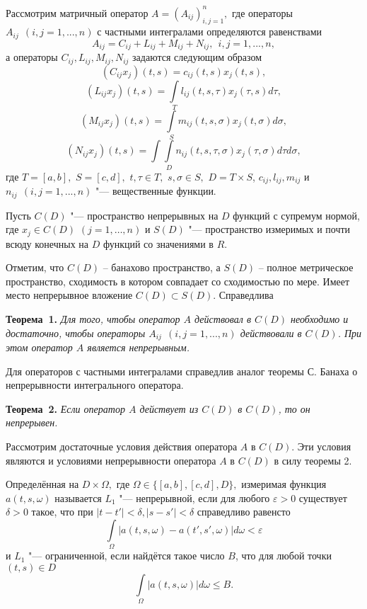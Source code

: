 \vzmscaption

Рассмотрим матричный оператор $A= (A_{ij})_{i,j=1}^n,$
где операторы $A_{ij} \ \ (i,j=1,...,n)$ с частными интегралами определяются равенствами
$$
A_{ij}=C_{ij}+L_{ij}+M_{ij}+N_{ij}, \ \ i,j=1,...,n,
$$
а операторы $C_{ij},L_{ij},M_{ij},N_{ij}$ задаются следующим образом
$$
(C_{ij}x_j)(t,s)=c_{ij}(t,s)x_j(t,s),
$$
$$
(L_{ij}x_j)(t,s)=\int\limits_T l_{ij}(t,s,\tau)x_j(\tau,s)d\tau,
$$
$$
(M_{ij}x_j)(t,s)=\int\limits_S m_{ij}(t,s,\sigma)x_j(t,\sigma)d\sigma,
$$
$$
(N_{ij}x_j)(t,s)=\int\int\limits_D n_{ij}(t,s,\tau,\sigma)x_j(\tau,\sigma)d\tau d\sigma,
$$
где $T=[a,b],$ $S=[c,d],$ $t,\tau\in T,$ $s,\sigma\in S,$ $D=T\times S $, $c_{ij}, l_{ij}, m_{ij}$ и $n_{ij} \ \ (i,j=1,...,n)$ "--- вещественные функции.

Пусть $C(D)$ "--- пространство непрерывных на $D$ функций с супремум нормой, где $x_j\in C(D)$ $(j=1,\dots,n)$ и $S(D)$ "--- пространство измеримых и почти всюду конечных на $D$ функций со значениями в $R$.

Отметим, что $C(D)$ -- банахово пространство, а $S(D)$ -- полное
метрическое пространство, сходимость в котором совпадает со
сходимостью по мере. Имеет место непрерывное вложение
$C(D)\subset S(D)$. Справедлива

\textbf{Теорема~1.} {\it Для того, чтобы оператор $A$ действовал в $C(D)$ необходимо и достаточно, чтобы операторы $A_{ij} \ \ (i,j=1,...,n)$ действовали в $C(D)$. При этом оператор $A$ является непрерывным.}

Для операторов с частными интегралами справедлив аналог теоремы
С. Банаха о непрерывности интегрального оператора.

\textbf{Теорема~2.} {\it Если оператор $A$ действует из $C(D)$ в $C(D)$, то он непрерывен.}

Рассмотрим достаточные условия действия оператора $A$ в
$C(D)$. Эти условия являются и условиями непрерывности оператора
$A$ в $C(D)$ в силу теоремы 2.

Определённая на $D\times\Omega,$ где $\Omega\in\{[a,b], [c,d], D\},$ измеримая функция $a(t,s,\omega)$ называется $L_1$ "--- непрерывной, если для любого $\varepsilon>0$ существует $\delta>0$ такое, что при $|t-t'|<\delta, |s-s'|<\delta$ справедливо равенсто
$$
\int\limits_\Omega|a(t,s,\omega)-a(t',s',\omega)|d\omega<\varepsilon
$$
и $L_1$ "--- ограниченной, если найдётся такое число $B$, что для любой точки
$(t,s)\in D$
$$
\int\limits_\Omega|a(t,s,\omega)|d\omega\le B.
$$


